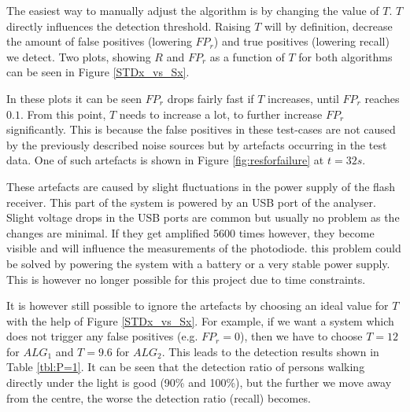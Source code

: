 The easiest way to manually adjust the algorithm is by changing the value of $T$. $T$ directly influences the detection threshold. Raising $T$ will by definition, decrease the amount of false positives (lowering $FP_r$) and true positives (lowering recall) we detect. Two plots, showing $R$ and $FP_r$ as a function of $T$ for both algorithms can be seen in Figure \ref{STDx_vs_Sx}. 

In these plots it can be seen $FP_r$ drops fairly fast if $T$ increases, until $FP_r$ reaches $0.1$. From this point, $T$ needs to increase a lot, to further increase $FP_r$ significantly. This is because the false positives in these test-cases are not caused by the previously described noise sources but by artefacts occurring in the test data. One of such artefacts is shown in Figure \ref{fig:resforfailure} at $t = 32s$.

These artefacts are caused by slight fluctuations in the power supply of the flash receiver. This part of the system is powered by an USB port of the analyser. Slight voltage drops in the USB ports are common but usually no problem as the changes are minimal. If they get amplified 5600 times however, they become visible and will influence the measurements of the photodiode. this problem could be solved by powering the system with a battery or a very stable power supply. This is however no longer possible for this project due to time constraints.

It is however still possible to ignore the artefacts by choosing an ideal value for $T$ with the help of Figure \ref{STDx_vs_Sx}. For example, if we want a system which does not trigger any false positives (e.g. $FP_r = 0$), then we have to choose $T = 12$ for $ALG_1$ and $T = 9.6$ for $ALG_2$. This leads to the detection results shown in Table \ref{tbl:P=1}. It can be seen that the detection ratio of persons walking directly under the light is good (90\% and 100\%), but the further we move away from the centre, the worse the detection ratio (recall) becomes.

